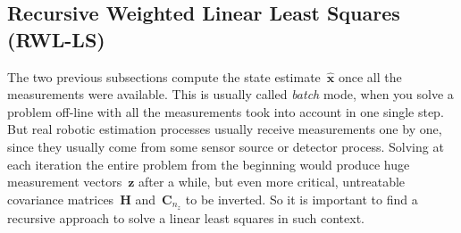 \subsection{Recursive Weighted Linear Least Squares (RWL-LS)}
The two previous subsections compute the state estimate~$\hat{\mathbf{x}}$ once all the measurements were available. This is usually called \textit{batch} mode, when you solve a problem off-line with all the measurements took into account in one single step. But real robotic estimation processes usually receive measurements one by one, since they usually come from some sensor source or detector process. Solving at each iteration the entire problem from the beginning would produce huge measurement vectors~$\mathbf{z}$ after a while, but even more critical, untreatable covariance matrices~$\mathbf{H}$ and~$\mathbf{C}_{n_z}$ to be inverted. So it is important to find a recursive approach to solve a linear least squares in such context. 

